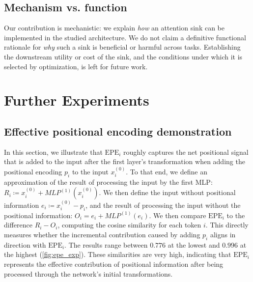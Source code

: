 \documentclass[11pt]{article}
\begin{document}
\subsection{Mechanism vs. function}
Our contribution is mechanistic: we explain \emph{how} an attention sink can be implemented in the studied architecture. We do not claim a definitive functional rationale for \emph{why} such a sink is beneficial or harmful across tasks. Establishing the downstream utility or cost of the sink, and the conditions under which it is selected by optimization, is left for future work.



\appendix

\section{Further Experiments}

\subsection{Effective positional encoding demonstration} \label{app:epe_exp}
In this section, we illustrate that $\mathrm{EPE}_i$ roughly captures the net positional signal that is added to the input after the first layer's transformation when adding the positional encoding $p_i$ to the input $x_i^{(0)}$. To that end, we define an approximation of the result of processing the input by the first MLP: $R_i \coloneq x_i^{(0)} + MLP^{(1)}(x_i^{(0)})$. We then define the input without positional information $e_i \coloneq x_i^{(0)}-p_i$, and the result of processing the input without the positional information: $O_i=e_i + MLP^{(1)}(e_i)$. We then compare \(\mathrm{EPE}_i\) to the difference \(R_i - O_i\), computing the cosine similarity for each token \(i\). This directly measures whether the incremental contribution caused by adding \(p_i\) aligns in direction with \(\mathrm{EPE}_i\). The results range between $0.776$ at the lowest and $0.996$ at the highest (\cref{fig:epe_exp}). These similarities are very high, indicating that $\mathrm{EPE}_i$ represents the effective contribution of positional information after being processed through the network's initial transformations.
\end{document}

